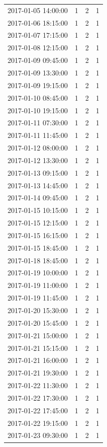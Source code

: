 \begin{tabular}{lrrr}
2017-01-05 14:00:00 & 1 & 2 & 1 \\
2017-01-06 18:15:00 & 1 & 2 & 1 \\
2017-01-07 17:15:00 & 1 & 2 & 1 \\
2017-01-08 12:15:00 & 1 & 2 & 1 \\
2017-01-09 09:45:00 & 1 & 2 & 1 \\
2017-01-09 13:30:00 & 1 & 2 & 1 \\
2017-01-09 19:15:00 & 1 & 2 & 1 \\
2017-01-10 08:45:00 & 1 & 2 & 1 \\
2017-01-10 19:15:00 & 1 & 2 & 1 \\
2017-01-11 07:30:00 & 1 & 2 & 1 \\
2017-01-11 11:45:00 & 1 & 2 & 1 \\
2017-01-12 08:00:00 & 1 & 2 & 1 \\
2017-01-12 13:30:00 & 1 & 2 & 1 \\
2017-01-13 09:15:00 & 1 & 2 & 1 \\
2017-01-13 14:45:00 & 1 & 2 & 1 \\
2017-01-14 09:45:00 & 1 & 2 & 1 \\
2017-01-15 10:15:00 & 1 & 2 & 1 \\
2017-01-15 12:15:00 & 1 & 2 & 1 \\
2017-01-15 16:15:00 & 1 & 2 & 1 \\
2017-01-15 18:45:00 & 1 & 2 & 1 \\
2017-01-18 18:45:00 & 1 & 2 & 1 \\
2017-01-19 10:00:00 & 1 & 2 & 1 \\
2017-01-19 11:00:00 & 1 & 2 & 1 \\
2017-01-19 11:45:00 & 1 & 2 & 1 \\
2017-01-20 15:30:00 & 1 & 2 & 1 \\
2017-01-20 15:45:00 & 1 & 2 & 1 \\
2017-01-21 15:00:00 & 1 & 2 & 1 \\
2017-01-21 15:15:00 & 1 & 2 & 1 \\
2017-01-21 16:00:00 & 1 & 2 & 1 \\
2017-01-21 19:30:00 & 1 & 2 & 1 \\
2017-01-22 11:30:00 & 1 & 2 & 1 \\
2017-01-22 17:30:00 & 1 & 2 & 1 \\
2017-01-22 17:45:00 & 1 & 2 & 1 \\
2017-01-22 19:15:00 & 1 & 2 & 1 \\
2017-01-23 09:30:00 & 1 & 2 & 1 \\

\end{tabular}
